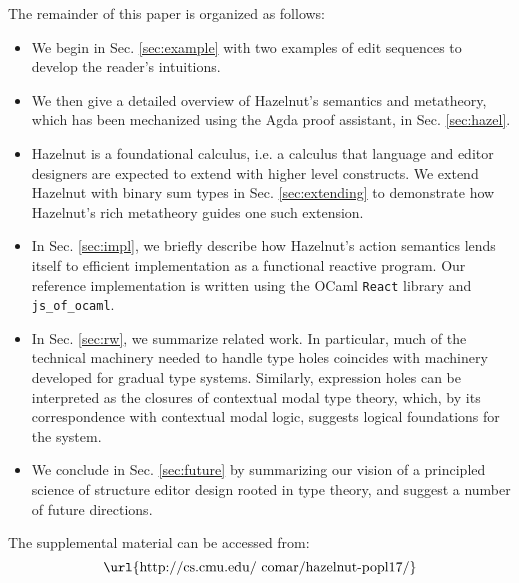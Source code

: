 The remainder of this paper is organized as follows:
\begin{itemize}[itemsep=0px,partopsep=2px,topsep=2px]
  \item We begin in Sec.  \ref{sec:example} with two examples of edit
    sequences to develop the reader's intuitions.

  \item We then give a detailed overview of Hazelnut's semantics and
  metatheory, which has been mechanized using the Agda proof assistant, in
  Sec.  \ref{sec:hazel}.

  \item Hazelnut is a {foundational} calculus, i.e. a calculus that
  language and editor designers are expected to extend with higher level
  constructs. We extend Hazelnut with binary sum types in
  Sec.  \ref{sec:extending} to demonstrate how Hazelnut's rich metatheory
  guides one such extension.

  \item In Sec.  \ref{sec:impl}, we briefly describe how Hazelnut's action
  semantics lends itself to efficient implementation as a functional
  reactive program. Our reference implementation is written
  using the OCaml \lstinline{React} library and \lstinline{js_of_ocaml}.

  \item In Sec.  \ref{sec:rw}, we summarize related work. In particular,
  much of the technical machinery needed to handle type holes coincides
  with machinery developed for gradual type systems. Similarly,
  expression holes can be interpreted as the closures of contextual modal
  type theory, which, by its correspondence with contextual modal logic,
  suggests logical foundations for the system.

  \item We conclude in Sec.  \ref{sec:future} by summarizing our vision of
  a principled science of structure editor design rooted in type theory,
  and suggest a number of future directions.
\end{itemize}
The supplemental material can be accessed from:
\[\text{\url{http://cs.cmu.edu/~comar/hazelnut-popl17/}} \]
